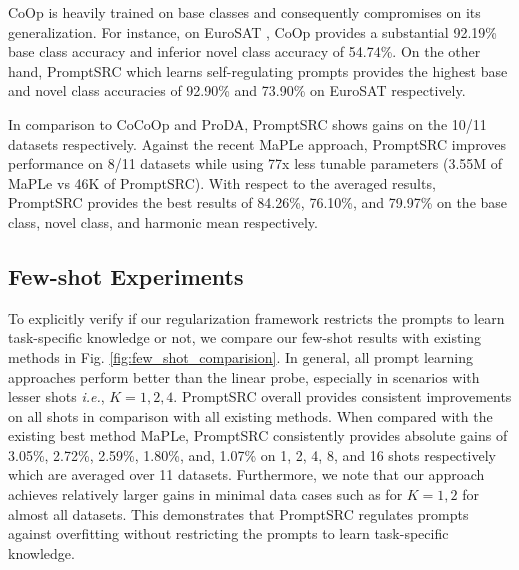 \documentclass[10pt,twocolumn,letterpaper]{article}
\def\ie{\emph{i.e.}\xspace}
\begin{document}
CoOp is heavily trained on base classes and consequently compromises on its generalization. For instance, on EuroSAT \cite{helber2019eurosat}, CoOp provides a substantial 92.19\% base class accuracy and inferior novel class accuracy of 54.74\%. On the other hand, PromptSRC which learns self-regulating prompts provides the highest base and novel class accuracies of 92.90\% and 73.90\% on EuroSAT respectively.

In comparison to CoCoOp and ProDA, PromptSRC shows gains on the 10/11 datasets respectively. {Against the recent MaPLe approach, PromptSRC improves performance on 8/11 datasets while using 77x less tunable parameters (3.55M of MaPLe vs 46K of PromptSRC).} With respect to the averaged results, PromptSRC provides the best results of 84.26\%, 76.10\%, and 79.97\%  on the base class, novel class, and harmonic mean respectively. 

\subsection{Few-shot Experiments}
To explicitly verify if our regularization framework restricts the prompts to learn task-specific knowledge or not, we compare our few-shot results with existing methods in Fig. \ref{fig:few_shot_comparision}.
In general, all prompt learning approaches perform better than the linear probe, especially in scenarios with lesser shots \ie, $K=1, 2, 4$. PromptSRC overall provides consistent improvements on all shots in comparison with all existing methods. {When compared with the existing best method MaPLe, PromptSRC consistently provides absolute gains of 3.05\%, 2.72\%, 2.59\%,	1.80\%, and, 1.07\% on 1, 2, 4, 8, and 16 shots respectively which are averaged over 11 datasets.} 
Furthermore, we note that our approach achieves relatively larger gains in minimal data cases such as for $K=1, 2$ for almost all datasets. This demonstrates that PromptSRC regulates prompts against overfitting without restricting the prompts to learn task-specific knowledge. 
\end{document}
